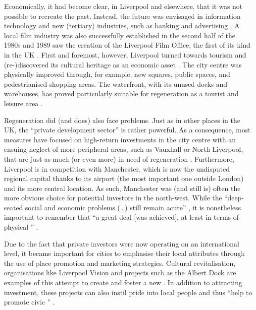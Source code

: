 Economically, it had become clear, in Liverpool and elsewhere, that it was not possible to recreate the past.
Instead, the future was envisaged in information technology and new (tertiary) industries, such as banking and advertising \citep[cf.][32]{fraser2003}.
A local film industry was also successfully established in the second half of the 1980s and 1989 saw the creation of the Liverpool Film Office, the first of its kind in the UK \citep[cf.][479]{murden2006}.
First and foremost, however, Liverpool turned towards tourism and (re-)discovered its cultural heritage as an economic asset \citep[cf.][32--33]{fraser2003}.
The city centre was physically improved through, for example, new squares, public spaces, and pedestrianised shopping areas.
The waterfront, with its unused docks and warehouses, has proved particularly suitable for regeneration as a tourist and leisure area \citep[173--174]{couch2003a}.

Regeneration did (and does) also face problems.
Just as in other places in the UK, the ``private development sector'' is rather powerful.
As a consequence, most measures have focused on high-return investments in the city centre with an ensuing neglect of more peripheral areas, such as Vauxhall or North Liverpool, that are just as much (or even more) in need of regeneration \citep[cf.][49]{couch2003}.
Furthermore, Liverpool is in competition with Manchester, which is now the undisputed regional capital thanks to its airport (the most important one outside London) and its more central location.
As such, Manchester was (and still is) often the more obvious choice for potential investors in the north-west.
While the ``deep-seated social and economic problems (\ldots) still remain acute'' \citep[188]{fraser2003a}, it is nonetheless important to remember that ``a great deal [was achieved], at least in terms of physical '' \citep[44]{couch2003}.

Due to the fact that private investors were now operating on an international level, it became important for cities to emphasise their local attributes through the use of place promotion and marketing strategies.
Cultural revitalisation, organisations like Liverpool Vision and  projects such as the Albert Dock are examples of this attempt to create and foster a new .
In addition to attracting investment, these projects can also instil pride into local people and thus ``help to promote civic '' \citep[cf.][201--203]{percy2003}.

